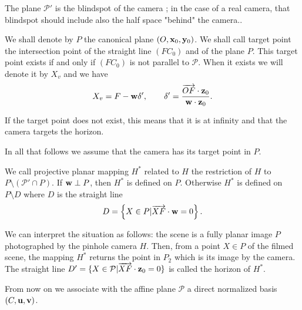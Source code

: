 \begin{remarque}
The plane $\mathcal{P}'$ is the blindspot of the camera ; in the case of a real camera, that blindspot should include also the half space "behind" the camera..
\end{remarque}


\begin{Def} 
We shall denote by $P$ the canonical plane $(O,\mathbf{x}_0,\mathbf{y}_0)$.
We shall call target point the intersection point of the straight line $(FC_0)$ and of the plane $P$. This target point exists if and only if $(FC_0)$ is not parallel to $\mathcal{P}$. When it exists we will denote it by $X_v$ and we have
\begin{equation*}
X_v=F-\mathbf{w} \delta',~~~~~~\delta'=\frac{\overrightarrow{OF}\cdot \mathbf{z}_0}{\mathbf{w} \cdot \mathbf{z}_0}.
\label{formule_point_vise}
\end{equation*}
\label{point_vise}
\end{Def}


\begin{remarque}
If the target point does not exist, this means that it is at infinity and that the camera targets the horizon.
\end{remarque}


In all that follows we assume that the camera has its target point in $P$.

\begin{Def}
We call projective planar mapping $H^*$ related to $H$ the restriction of $H$ to $P\setminus (\mathcal{P}'\cap P)$. 
If $\mathbf{w} \perp P $, then $H^*$ is defined on $P$. Otherwise $H^*$ is defined on $P\setminus D$ where $D$ is the straight line
\begin{equation*}
D=\left\{ X\in P | \overrightarrow{XF}\cdot \mathbf{w} = 0\right\}.
\end{equation*}
\end{Def}

\begin{remarque}
We can interpret the situation as follows: the scene is a fully planar image $P$ photographed by the pinhole camera $H$.  Then, from a point $X\in P$ of the filmed scene, the mapping $H^*$ returns the point in $P_2$ which is its image by the camera. The straight line $D'=\{ X \in \mathcal{P} | \overrightarrow{XF} \cdot \mathbf{z}_0 =0 \}$ is called the horizon of $H^*$.
\end{remarque}

From now on we associate with the affine plane $\mathcal{P}$ a direct normalized basis $(C,\mathbf{u},\mathbf{v})$. 

